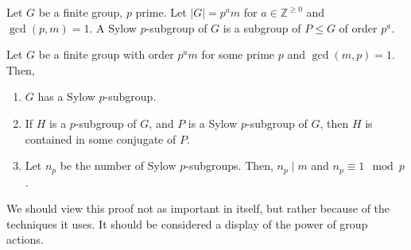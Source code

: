 \documentclass[12pt]{scrartcl}
\begin{document}
Let $G$ be a finite group, $p$ prime.
Let $|G| = p^am$ for $a \in \mathbb{Z}^{\geq 0}$ and $\gcd(p, m) = 1$.
A Sylow $p$-subgroup of $G$ is a subgroup of $P \leq G$ of order $p^a$.  
\begin{theorem}
		Let $G$ be a finite group with order $p^am$ for some prime $p$ and $\gcd(m, p) = 1$.
		Then,
	\begin{enumerate}[label=\alph*)]
			\item $G$ has a Sylow $p$-subgroup.
		\item If $H$ is a $p$-subgroup of $G$, and $P$ is a Sylow $p$-subgroup of $G$, then $H$ is contained in some conjugate of $P$.
		\item Let $n_p$ be the number of Sylow $p$-subgroups.
			Then, $n_p \mid m$ and $n_p \equiv 1 \mod p$.  
	\end{enumerate}
\end{theorem}
\begin{motivation}
We should view this proof not as important in itself, but rather because of the techniques it uses.
It should be considered a display of the power of group actions.
\end{motivation}
\end{document}
